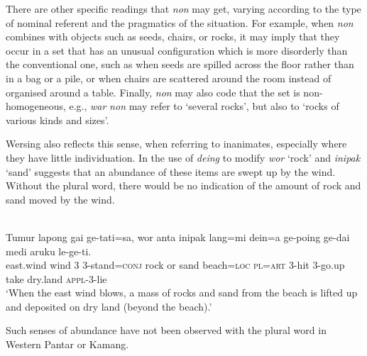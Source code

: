 There are other specific readings that \textit{non} may get, varying according to the type of nominal referent and the pragmatics of the situation. For example, when \textit{non} combines with objects such as seeds, chairs, or rocks, it may imply that they occur in a set that has an unusual configuration which is more disorderly than the conventional one, such as when seeds are spilled across the floor rather than in a bag or a pile, or when chairs are scattered around the room instead of organised around a table. Finally, \textit{non} may also code that the set is non-homogeneous, e.g., \textit{war} \textit{non} may refer to `several rocks', but also to `rocks of various kinds and sizes'.

Wersing also reflects this sense, when referring to inanimates, especially where they have little individuation. In  the use of \textit{deing} to modify \textit{wor} `rock' and \textit{inipak} `sand' suggests that an abundance of these items are swept up by the wind. Without the plural word, there would be no indication of the amount of rock and sand moved by the wind.


\ea%
\label{ex:9:75}
 \\
\gll  Tumur lapong gai ge-tati=sa, wor anta inipak lang=mi dein=a ge-poing ge-dai medi aruku le-ge-ti.   \\
  east.wind wind 3 3-stand=\textsc{conj} rock or sand beach=\textsc{loc}   \textsc{pl=art} \textsc{3-}hit 3-go.up take dry.land \textsc{appl-3-}lie \\
\glt `When the east wind blows, a mass of rocks and sand from the beach is lifted up and deposited on dry land (beyond the beach).'
\z










Such senses of abundance have not been observed with the plural word in Western Pantar or Kamang.

